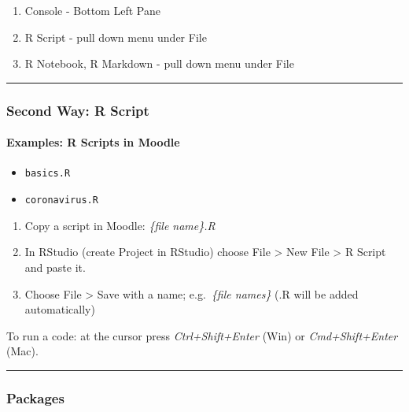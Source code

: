 \documentclass[
]{article}
\providecommand{\tightlist}{%
  \setlength{\itemsep}{0pt}\setlength{\parskip}{0pt}}
\begin{document}
\begin{enumerate}
\def\labelenumi{\arabic{enumi}.}
\tightlist
\item
  Console - Bottom Left Pane
\item
  R Script - pull down menu under File
\item
  R Notebook, R Markdown - pull down menu under File
\end{enumerate}

\begin{center}\rule{0.5\linewidth}{0.5pt}\end{center}

\hypertarget{second-way-r-script}{%
\subsubsection{Second Way: R Script}\label{second-way-r-script}}

\hypertarget{examples-r-scripts-in-moodle}{%
\paragraph{Examples: R Scripts in
Moodle}\label{examples-r-scripts-in-moodle}}

\begin{itemize}
\tightlist
\item
  \texttt{basics.R}
\item
  \texttt{coronavirus.R}
\end{itemize}

\begin{enumerate}
\def\labelenumi{\arabic{enumi}.}
\tightlist
\item
  Copy a script in Moodle: \emph{\{file name\}.R}
\item
  In RStudio (create Project in RStudio) choose File \textgreater{} New
  File \textgreater{} R Script and paste it.
\item
  Choose File \textgreater{} Save with a name; e.g.~\emph{\{file
  names\}} (.R will be added automatically)
\end{enumerate}

To run a code: at the cursor press \emph{Ctrl+Shift+Enter} (Win) or
\emph{Cmd+Shift+Enter} (Mac).

\begin{center}\rule{0.5\linewidth}{0.5pt}\end{center}

\hypertarget{packages}{%
\subsubsection{Packages}\label{packages}}
\end{document}
